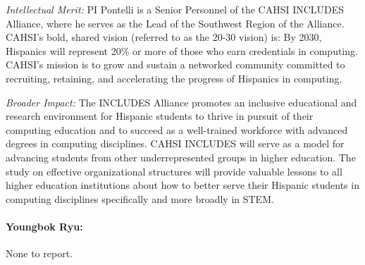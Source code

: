 \noindent \textit{Intellectual Merit:}
PI Pontelli is a Senior Personnel of the CAHSI INCLUDES Alliance, where he serves as the Lead of the Southwest Region of the Alliance. CAHSI’s bold, shared vision (referred to as the 20-30 vision) is:  By 2030, Hispanics will represent 20\% or more of those who earn credentials in computing. 
CAHSI’s mission is to grow and sustain a networked community committed to recruiting, retaining, and accelerating the progress of Hispanics in computing.


\noindent \textit{Broader Impact:}
The INCLUDES Alliance promotes an inclusive educational and research environment for Hispanic students to thrive in pursuit of their computing education and to succeed as a well-trained workforce with advanced degrees in computing disciplines. 
CAHSI INCLUDES will serve as a model for advancing students from other underrepresented groups in higher education. The study on effective organizational structures will provide valuable lessons to all higher education institutions about how to better serve their Hispanic students in computing disciplines specifically and more broadly in STEM. 

\paragraph{Youngbok Ryu:} None to report.


